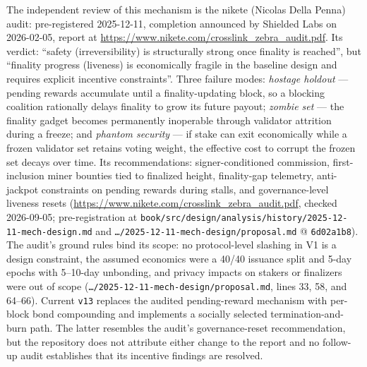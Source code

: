 \documentclass[11pt,a4paper]{article}
\theoremstyle{definition}
\begin{document}
The independent review of this mechanism is the nikete (Nicolas Della
Penna) audit: pre-registered 2025-12-11, completion announced by Shielded
Labs on 2026-02-05, report at
\url{https://www.nikete.com/crosslink_zebra_audit.pdf}.
Its verdict: ``safety (irreversibility) is structurally strong once
finality is reached'', but ``finality progress (liveness) is economically
fragile in the baseline design and requires explicit incentive
constraints''. Three failure modes: \emph{hostage holdout} --- pending
rewards accumulate until a finality-updating block, so a blocking
coalition rationally delays finality to grow its future payout;
\emph{zombie set} --- the finality gadget becomes permanently inoperable
through validator attrition during a freeze; and \emph{phantom security}
--- if stake can exit economically while a frozen validator set retains
voting weight, the effective cost to corrupt the frozen set decays over
time. Its recommendations: signer-conditioned commission, first-inclusion
miner bounties tied to finalized height, finality-gap telemetry,
anti-jackpot constraints on pending rewards during stalls, and
governance-level liveness resets
(\url{https://www.nikete.com/crosslink_zebra_audit.pdf}, checked
2026-09-05; pre-registration at
\texttt{book/src/design/analysis/history/2025-12-11-mech-design.md} and
\texttt{\ldots/2025-12-11-mech-design/proposal.md} @ \texttt{6d02a1b8}).
The
audit's ground rules bind its scope: no protocol-level slashing in V1 is
a design constraint, the assumed economics were a 40/40 issuance split
and 5-day epochs with 5--10-day unbonding, and privacy impacts on stakers
or finalizers were out of scope
(\texttt{\ldots/2025-12-11-mech-design/proposal.md}, lines 33, 58, and
64--66). Current \texttt{v13} replaces the audited pending-reward
mechanism with per-block bond compounding and implements a socially
selected termination-and-burn path. The latter resembles the audit's
governance-reset recommendation, but the repository does not attribute
either change to the report and no follow-up audit establishes that its
incentive findings are resolved.
\end{document}

